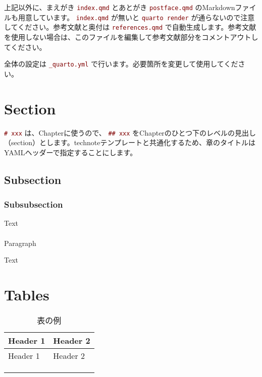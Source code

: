 \documentclass[
  japanese,
  letterpaper,
  lualatex,
  ja=standard,
  10pt,
  a4paper,
  textwidth-limit=50,
  openany]{bxjsbook}
\makeatletter
\let\oldparagraph\paragraph
\renewcommand{\paragraph}{
    \@ifstar
      \xxxParagraphStar
      \xxxParagraphNoStar
  }
\newcommand{\xxxParagraphStar}[1]{\oldparagraph*{#1}\mbox{}}
\newcommand{\xxxParagraphNoStar}[1]{\oldparagraph{#1}\mbox{}}
\let\oldtexttt\texttt
\renewcommand{\texttt}[1]{  %
  \colorbox{codebg}{  %
    \textcolor{Maroon}{  %
      \small  %
      \oldtexttt{#1}
    }
  }
}
\makeatother
\begin{document}
上記以外に、まえがき\texttt{index.qmd}とあとがき\texttt{postface.qmd}のMarkdownファイルも用意しています。\texttt{index.qmd}が無いと\texttt{quarto\ render}が通らないので注意してください。参考文献と奥付は\texttt{references.qmd}で自動生成します。参考文献を使用しない場合は、このファイルを編集して参考文献部分をコメントアウトしてください。

全体の設定は\texttt{\_quarto.yml}で行います。必要箇所を変更して使用してください。

\section{Section}\label{section}

\texttt{\#\ xxx}は、Chapterに使うので、\texttt{\#\#\ xxx}をChapterのひとつ下のレベルの見出し（section）とします。technoteテンプレートと共通化するため、章のタイトルはYAMLヘッダーで指定することにします。

\subsection{Subsection}\label{subsection}

\subsubsection{Subsubsection}\label{subsubsection}

Text

\paragraph{Paragraph}\label{paragraph}

Text

\section{Tables}\label{tables}

\begin{longtable}[]{@{}ll@{}}
\caption{表の例}\label{tbl-xxx}\tabularnewline
\toprule\noalign{}
Header 1 & Header 2 \\
\midrule\noalign{}
\endfirsthead
\toprule\noalign{}
Header 1 & Header 2 \\
\midrule\noalign{}
\endhead
\bottomrule\noalign{}
\endlastfoot
& \\
& \\
& \\
\end{longtable}
\end{document}
